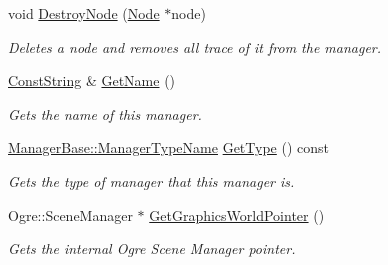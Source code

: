 \begin{DoxyCompactItemize}
void \hyperlink{classphys_1_1SceneManager_a4c26ed31f84b171101db2b5ef184d701}{DestroyNode} (\hyperlink{classphys_1_1Node}{Node} $\ast$node)
\begin{DoxyCompactList}\small\item\em Deletes a node and removes all trace of it from the manager. \item\end{DoxyCompactList}\item 
\hyperlink{namespacephys_a5ce5049f8b4bf88d6413c47b504ebb31}{ConstString} \& \hyperlink{classphys_1_1SceneManager_ae63c31649eb018435087ce48307e2245}{GetName} ()
\begin{DoxyCompactList}\small\item\em Gets the name of this manager. \item\end{DoxyCompactList}\item 
\hyperlink{classphys_1_1ManagerBase_aaa6ccddf23892eaccb898529414f80a5}{ManagerBase::ManagerTypeName} \hyperlink{classphys_1_1SceneManager_af2b4f6bc50d40ffe06f6172c3d1dd02d}{GetType} () const 
\begin{DoxyCompactList}\small\item\em Gets the type of manager that this manager is. \item\end{DoxyCompactList}\item 
Ogre::SceneManager $\ast$ \hyperlink{classphys_1_1SceneManager_af3e5081f780b6527f075d1bb579f0601}{GetGraphicsWorldPointer} ()
\begin{DoxyCompactList}\small\item\em Gets the internal Ogre Scene Manager pointer. \item\end{DoxyCompactList}\end{DoxyCompactItemize}
